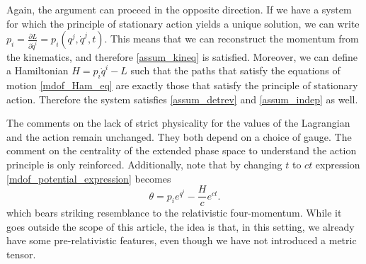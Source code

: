 \documentclass[10pt,twocolumn, nofootinbib]{revtex4-2}
\begin{document}
Again, the argument can proceed in the opposite direction. If we have a system for which the principle of stationary action yields a unique solution, we can write $p_i = \frac{\partial L}{\partial \dot{q}^i} = p_i(q^j, \dot{q}^j, t)$. This means that we can reconstruct the momentum from the kinematics, and therefore \ref{assum_kineq} is satisfied. Moreover, we can define a Hamiltonian $H = p_i \dot{q}^i - L$ such that the paths that satisfy the equations of motion \ref{mdof_Ham_eq} are exactly those that satisfy the principle of stationary action. Therefore the system satisfies \ref{assum_detrev} and \ref{assum_indep} as well.

The comments on the lack of strict physicality for the values of the Lagrangian and the action remain unchanged. They both depend on a choice of gauge. The comment on the centrality of the extended phase space to understand the action principle is only reinforced. Additionally, note that by changing $t$ to $ct$ expression \ref{mdof_potential_expression} becomes
\begin{equation}\label{mdof_potential_relativistic}
	\theta = p_i e^{q^i} - \frac{H}{c} e^{ct}.
\end{equation}
which bears striking resemblance to the relativistic four-momentum. While it goes outside the scope of this article, the idea is that, in this setting, we already have some pre-relativistic features, even though we have not introduced a metric tensor.
\end{document}
